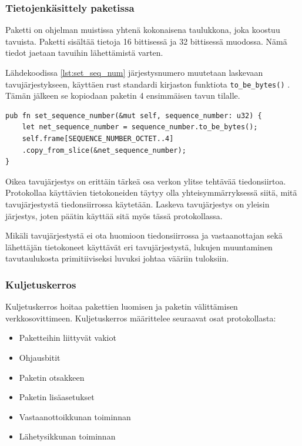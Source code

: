 \documentclass[a4paper,12pt]{article}
\begin{document}
    \subsubsection{Tietojenkäsittely paketissa}
    Paketti on ohjelman muistissa yhtenä kokonaisena taulukkona, joka koostuu tavuista.
    Paketti sisältää tietoja 16 bittisessä ja 32 bittisessä muodossa. Nämä tiedot jaetaan tavuihin lähettämistä varten.

    Lähdekoodissa \ref{lst:set_seq_num} järjestysnumero muutetaan laskevaan tavujärjestykseen, käyttäen rust standardi kirjaston funktiota \lstinline{to_be_bytes()} \cite{rust_doc_u32}. Tämän jälkeen se kopiodaan paketin 4 ensimmäisen tavun tilalle. \par
    
        \begin{lstlisting}[caption={Järjestusnumeron asettaminen pakettiin}, label={lst:set_seq_num}]
pub fn set_sequence_number(&mut self, sequence_number: u32) {
    let net_sequence_number = sequence_number.to_be_bytes();
    self.frame[SEQUENCE_NUMBER_OCTET..4]
    .copy_from_slice(&net_sequence_number);
}\end{lstlisting}


    Oikea tavujärjestys on erittäin tärkeä osa verkon ylitse tehtävää tiedonsiirtoa. Protokollaa käyttävien tietokoneiden täytyy olla yhteisymmärryksessä siitä, mitä tavujärjestystä tiedonsiirrossa käytetään. Laskeva tavujärjestys on yleisin järjestys, joten päätin käyttää sitä myös tässä protokollassa. \par
    Mikäli tavujärjestystä ei ota huomioon tiedonsiirrossa ja vastaanottajan sekä lähettäjän tietokoneet käyttävät eri tavujärjestystä, lukujen muuntaminen tavutaulukosta primitiiviseksi luvuksi johtaa vääriin tuloksiin.
    \cite{Adiga2007HowC}

    \subsubsection{Kuljetuskerros}\label{subsec:kuljetuskerros}
    Kuljetuskerros hoitaa pakettien luomisen ja paketin välittämisen verkkosovittimeen.
    Kuljetuskerros määrittelee seuraavat osat protokollasta:

    \begin{itemize}
        \item Paketteihin liittyvät vakiot
        \item Ohjausbitit
        \item Paketin otsakkeen
        \item Paketin lisäasetukset
        \item Vastaanottoikkunan toiminnan
        \item Lähetysikkunan toiminnan
    \end{itemize}
\end{document}
